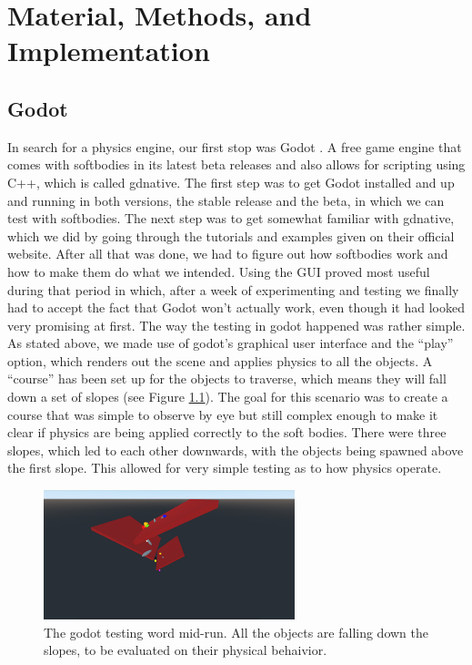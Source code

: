 \documentclass[12pt,oneside,listof=totoc,paper=a4,headings=small]{scrbook}
\begin{document}
\chapter{Material, Methods, and Implementation}


\section{Godot}
In search for a physics engine, our first stop was Godot \cite{linietsky2007godot}. A free game engine that comes with softbodies in its latest beta releases and  also allows for scripting using C++, which is called gdnative. The first step was to get Godot installed and up and running in both versions, the stable release and the beta, in which we can test with softbodies. The next step was to get somewhat familiar with gdnative, which we did by going through the tutorials and examples given on their official website. 
After all that was done, we had to figure out how softbodies work and how to make them do what we intended. Using the GUI proved most useful during that period in which, after a week of experimenting and testing we finally had to accept the fact that Godot won't actually work, even though it had looked very promising at first. 
The way the testing in godot happened was rather simple. As stated above, we made use of godot's graphical user interface and the ``play'' option, which renders out the scene and applies physics to all the objects. A ``course'' has been set up for the objects to traverse, which means they will fall down a set of slopes (see Figure \ref{fig:Godot}). The goal for this scenario was to create a course that was simple to observe by eye but still complex enough to make it clear if physics are being applied correctly to the soft bodies. There were three slopes, which led to each other downwards, with the objects being spawned above the first slope. This allowed for very simple testing as to how physics operate. 

\begin{figure}[h!]
\centering
\includegraphics[width=0.65\textwidth,height=0.65\textheight,keepaspectratio]{images/godot.png}
\caption{The godot testing word mid-run. All the objects are falling down the slopes, to be evaluated on their physical behaivior.}
\label{fig:Godot}
\end{figure}
\end{document}
